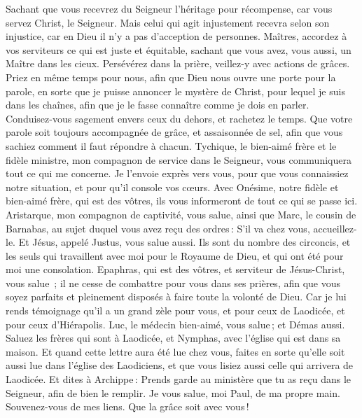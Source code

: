 \begin{multicols}{2}
Sachant que vous recevrez du Seigneur l’héritage pour récompense, car vous servez Christ, le Seigneur.
Mais celui qui agit injustement recevra selon son injustice, car en Dieu il n'y a pas d’acception de personnes.
\VerseOne{}Maîtres, accordez à vos serviteurs ce qui est juste et équitable, sachant que vous avez, vous aussi, un Maître dans les cieux.
Persévérez dans la prière, veillez-y avec actions de grâces.
Priez en même temps pour nous, afin que Dieu nous ouvre une porte pour la parole, en sorte que je puisse annoncer le mystère de Christ, pour lequel je suis dans les chaînes,
afin que je le fasse connaître comme je dois en parler.
Conduisez-vous sagement envers ceux du dehors, et rachetez le temps.
Que votre parole soit toujours accompagnée de grâce, et assaisonnée de sel, afin que vous sachiez comment il faut répondre à chacun.
Tychique, le bien-aimé frère et le fidèle ministre, mon compagnon de service dans le Seigneur, vous communiquera tout ce qui me concerne.
Je l’envoie exprès vers vous, pour que vous connaissiez notre situation, et pour qu’il console vos cœurs.
Avec Onésime, notre fidèle et bien-aimé frère, qui est des vôtres, ils vous informeront de tout ce qui se passe ici.
Aristarque, mon compagnon de captivité, vous salue, ainsi que Marc, le cousin de Barnabas, au sujet duquel vous avez reçu des ordres : S'il va chez vous, accueillez-le.
Et Jésus, appelé Justus, vous salue aussi. Ils sont du nombre des circoncis, et les seuls qui travaillent avec moi pour le Royaume de Dieu, et qui ont été pour moi une consolation.
Epaphras, qui est des vôtres, et serviteur de Jésus-Christ, vous salue ; il ne cesse de combattre pour vous dans ses prières, afin que vous soyez parfaits et pleinement disposés à faire toute la volonté de Dieu.
Car je lui rends témoignage qu'il a un grand zèle pour vous, et pour ceux de Laodicée, et pour ceux d'Hiérapolis.
Luc, le médecin bien-aimé, vous salue ; et Démas aussi.
Saluez les frères qui sont à Laodicée, et Nymphas, avec l'église qui est dans sa maison.
Et quand cette lettre aura été lue chez vous, faites en sorte qu'elle soit aussi lue dans l'église des Laodiciens, et que vous lisiez aussi celle qui arrivera de Laodicée.
Et dites à Archippe : Prends garde au ministère que tu as reçu dans le Seigneur, afin de bien le remplir.
Je vous salue, moi Paul, de ma propre main. Souvenez-vous de mes liens. Que la grâce soit avec vous !
\PPE{}
\end{multicols}
